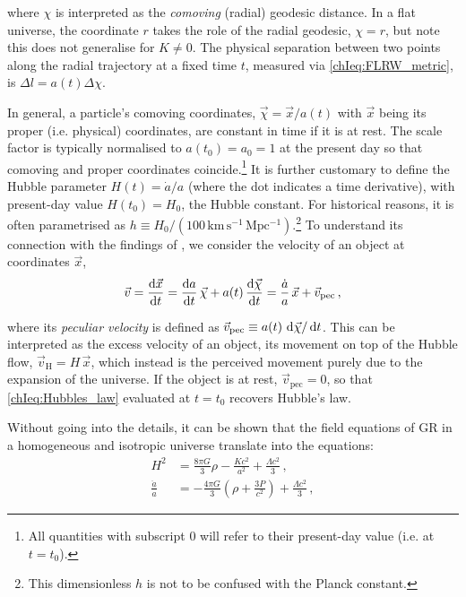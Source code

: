 \noindent where $\chi$ is interpreted as the \textit{comoving} (radial) geodesic distance. In a flat universe, the coordinate $r$ takes the role of the radial geodesic, $\chi = r$, but note this does not generalise for $K \neq 0$. The physical separation between two points along the radial trajectory at a fixed time $t$, measured via \cref{chIeq:FLRW_metric}, is $\Delta l = a(t) \Delta \chi$.

In general, a particle's comoving coordinates, $\vec{\chi} = \vec{x} / a(t)$ with $\vec{x}$ being its proper (i.e. physical) coordinates, are constant in time if it is at rest. The scale factor is typically normalised to $a(t_0) = a_0 = 1$ at the present day so that comoving and proper coordinates coincide.\footnote{All quantities with subscript $0$ will refer to their present-day value (i.e. at $t = t_0$).} It is further customary to define the Hubble parameter $H(t) = \dot{a}/a$ (where the dot indicates a time derivative), with present-day value $H(t_0) = H_0$, the Hubble constant. For historical reasons, it is often parametrised as $h \equiv H_0/(100 \, \mathrm{km \, s^{-1} \, Mpc^{-1}})$.\footnote{This dimensionless $h$ is not to be confused with the Planck constant.} To understand its connection with the findings of \citet{1929PNAS...15..168H}, we consider the velocity of an object at coordinates $\vec{x}$,
\begin{equation}
    \label{chIeq:Hubbles_law}
    \vec{v} = \frac{\dif \vec{x}}{\dif t} = \frac{\dif a}{\dif t} \, \vec{\chi} + a(t) \, \frac{\dif \vec{\chi}}{\dif t} = \frac{\dot{a}}{a} \, \vec{x} + \vec{v}_\text{pec} \, ,
\end{equation}

\noindent where its \textit{peculiar velocity} is defined as $\vec{v}_\text{pec} \equiv a(t) \, \dif \vec{\chi} / \dif t$. This can be interpreted as the excess velocity of an object, its movement on top of the Hubble flow, $\vec{v}_\text{H} = H \, \vec{x}$, which instead is the perceived movement purely due to the expansion of the universe. If the object is at rest, $\vec{v}_\text{pec} = 0$, so that \cref{chIeq:Hubbles_law} evaluated at $t = t_0$ recovers Hubble's law.

Without going into the details, it can be shown \citep[see e.g.][]{2010gfe..book.....M} that the field equations of GR in a homogeneous and isotropic universe translate into the \citeauthor{1922ZPhy...10..377F} equations:
\begin{align}
    \label{chIeq:Friedmann_equation1}
    H^2 & = \frac{8 \pi G}{3} \rho - \frac{K c^2}{a^2} + \frac{\Lambda c^2}{3} \, ,
    \\
    \label{chIeq:Friedmann_equation2}
    \frac{\ddot{a}}{a} & = -\frac{4 \pi G}{3} \left( \rho + \frac{3 P}{c^2} \right) + \frac{\Lambda c^2}{3} \, ,
\end{align}

